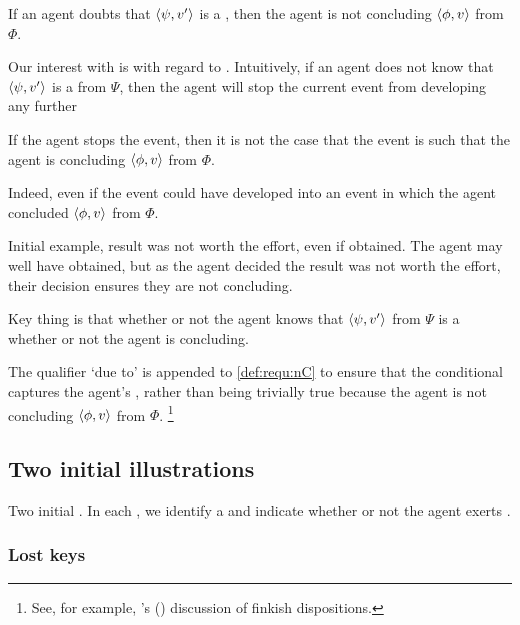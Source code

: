 \begin{note}
  If an agent doubts that \(\langle \psi, v' \rangle\) is a \fc{}, then the agent is not concluding \(\langle \phi, v \rangle\) from \(\Phi\).
\end{note}

\begin{note}
  Our interest with  is with regard to .
  Intuitively, if an agent does not know that \(\langle \psi, v' \rangle\) is a \fc{} from \(\Psi\), then the agent will stop the current event from developing any further

  If the agent stops the event, then it is not the case that the event is such that the agent is concluding \(\langle \phi, v \rangle\) from \(\Phi\).

  Indeed, even if the event could have developed into an event in which the agent concluded \(\langle \phi, v \rangle\) from \(\Phi\).

  Initial example, result was not worth the effort, even if obtained.
  The agent may well have obtained, but as the agent decided the result was not worth the effort, their decision ensures they are not concluding.
\end{note}

\begin{note}
  Key thing is that whether or not the agent knows that \(\langle \psi, v' \rangle\) from \(\Psi\) is a \fc{}  whether or not the agent is concluding.
\end{note}

\begin{note}
  The qualifier `due to' is appended to \ref{def:requ:nC} to ensure that the conditional captures the agent's \ninf{}, rather than being trivially true because the agent is not concluding \(\langle \phi, v \rangle\) from \(\Phi\).%
  \footnote{
    See, for example, \citeauthor{Lewis:1997wg}'s (\citeyear{Lewis:1997wg}) discussion of finkish dispositions.
  }
\end{note}

\subsection{Two initial illustrations}
\label{cha:requs:sec:init-illustr}

\begin{note}
  Two initial .
  In each , we identify a \requ{} and indicate whether or not the agent exerts \ninf{}.
\end{note}

\subsubsection{Lost keys}

